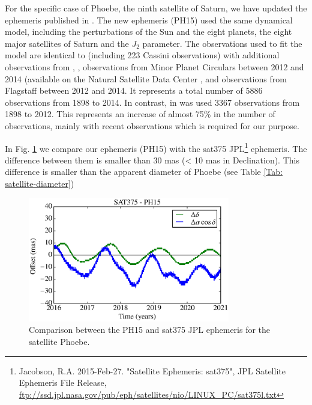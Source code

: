 \documentclass[useAMS,usenatbib]{mn2e}
\begin{document}
For the specific case of Phoebe, the ninth satellite of Saturn, we have updated the ephemeris published in \cite{Desmars2013}. The new ephemeris (PH15) used the same dynamical model, including the perturbations of the Sun and the eight planets, the eight major satellites of Saturn and the $J_2$ parameter. The observations used to fit the model are identical to \cite{Desmars2013} (including 223 Cassini observations) with additional observations from , \cite{Peng2015}, observations from Minor Planet Circulars between 2012 and 2014 (available on the Natural Satellite Data Center \textbf{\citep{Arlot2009}}, and observations from Flagstaff \citep{NOFS} between 2012 and 2014. It represents a total number of 5886 observations from 1898 to 2014. In contrast, in \cite{Desmars2013} was used 3367 observations from 1898 to 2012. This represents an increase of almost 75\% in the number of observations, mainly with recent observations which is required for our purpose.

In Fig. \ref{Fig:eph-Phoebe} we compare our ephemeris (PH15) with the sat375 JPL\footnote{Jacobson, R.A. 2015-Feb-27. "Satellite Ephemeris: sat375", JPL Satellite Ephemeris File Release, \url{ftp://ssd.jpl.nasa.gov/pub/eph/satellites/nio/LINUX_PC/sat375l.txt}} ephemeris. The difference between them is smaller than 30 mas (< 10 mas in Declination). This difference is smaller than the apparent diameter of Phoebe (see Table \ref{Tab: satellite-diameter})

\begin{figure}
\begin{centering}
\includegraphics[width=8.8cm]{figures/Phoebe.eps} 
\caption{Comparison between the PH15 and sat375 JPL ephemeris for the satellite Phoebe.}
\label{Fig:eph-Phoebe}
\end{centering}
\end{figure}
\end{document}
